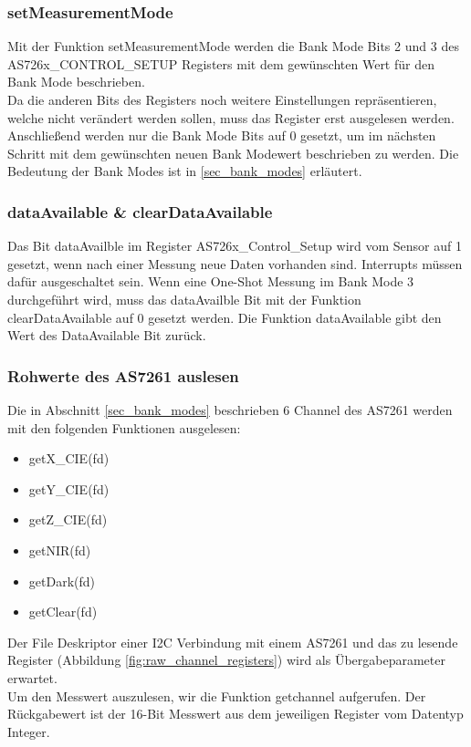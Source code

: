\subsubsection{setMeasurementMode}
Mit der Funktion setMeasurementMode werden die Bank Mode Bits 2 und 3 des \\
AS726x\_CONTROL\_SETUP Registers mit dem gewünschten Wert für den Bank Mode beschrieben.\\
Da die anderen Bits des Registers noch weitere Einstellungen repräsentieren, welche nicht verändert werden sollen, muss das Register erst ausgelesen werden.
Anschließend werden nur die Bank Mode Bits auf 0 gesetzt, um im nächsten Schritt mit dem gewünschten neuen Bank Modewert beschrieben zu werden. 
Die Bedeutung der Bank Modes ist in \ref{sec_bank_modes} erläutert.

\subsubsection{dataAvailable \& clearDataAvailable}
Das Bit dataAvailble im Register AS726x\_Control\_Setup wird vom Sensor auf 1 gesetzt, wenn nach einer Messung neue Daten vorhanden sind. Interrupts müssen dafür ausgeschaltet sein.
Wenn eine One-Shot Messung im Bank Mode 3 durchgeführt wird, muss das dataAvailble Bit mit der Funktion clearDataAvailable auf 0 gesetzt werden. Die Funktion dataAvailable gibt den Wert des DataAvailable Bit zurück.\\

%

\subsubsection{Rohwerte des AS7261 auslesen}
Die in Abschnitt \ref{sec_bank_modes} beschrieben 6 Channel des AS7261 werden mit den folgenden Funktionen ausgelesen:
\begin{itemize}
	\item getX\_CIE(fd)
	\item getY\_CIE(fd)
	\item getZ\_CIE(fd)
	\item getNIR(fd)
	\item getDark(fd) 
	\item getClear(fd)
\end{itemize}
Der File Deskriptor einer I2C Verbindung mit einem AS7261 und das zu lesende Register (Abbildung \ref{fig:raw_channel_registers}) wird als Übergabeparameter erwartet.\\
Um den Messwert auszulesen, wir die Funktion getchannel aufgerufen.
Der Rückgabewert ist der 16-Bit Messwert aus dem jeweiligen Register vom Datentyp Integer.


